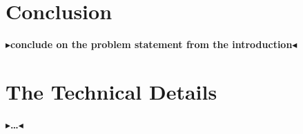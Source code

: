 \documentclass[twoside,11pt,openright]{report}
\newcommand{\todo}[1]{{\color[rgb]{.5,0,0}\textbf{$\blacktriangleright$#1$\blacktriangleleft$}}}
\begin{document}
\chapter{Conclusion}
\label{ch:conclusion}

\todo{conclude on the problem statement from the introduction}


\cleardoublepage
{}
 



\cleardoublepage
\appendix
\chapter{The Technical Details}

\todo{\dots}
\end{document}
